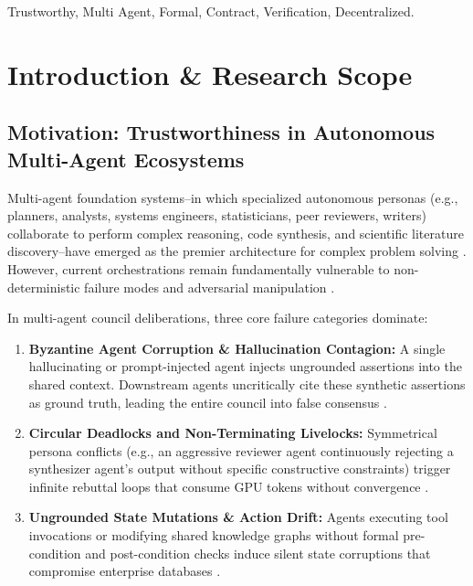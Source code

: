 \documentclass[10pt,journal,compsoc,twocolumn]{IEEEtran}
\begin{document}
\begin{IEEEkeywords}
Trustworthy, Multi Agent, Formal, Contract, Verification, Decentralized.
\end{IEEEkeywords}






\section{Introduction \& Research Scope}



\subsection{Motivation: Trustworthiness in Autonomous Multi-Agent Ecosystems}


Multi-agent foundation systems--in which specialized autonomous personas (e.g., planners, analysts, systems engineers, statisticians, peer reviewers, writers) collaborate to perform complex reasoning, code synthesis, and scientific literature discovery--have emerged as the premier architecture for complex problem solving \cite{arxiv_2005_14165,arxiv_2405_01543}. However, current orchestrations remain fundamentally vulnerable to non-deterministic failure modes and adversarial manipulation \cite{arxiv_2312_03893}.

In multi-agent council deliberations, three core failure categories dominate:
\begin{enumerate}
  \item \textbf{Byzantine Agent Corruption \& Hallucination Contagion:} A single hallucinating or prompt-injected agent injects ungrounded assertions into the shared context. Downstream agents uncritically cite these synthetic assertions as ground truth, leading the entire council into false consensus \cite{arxiv_2406_00584}.
  \item \textbf{Circular Deadlocks and Non-Terminating Livelocks:} Symmetrical persona conflicts (e.g., an aggressive reviewer agent continuously rejecting a synthesizer agent's output without specific constructive constraints) trigger infinite rebuttal loops that consume GPU tokens without convergence \cite{arxiv_2501_02497}.
  \item \textbf{Ungrounded State Mutations \& Action Drift:} Agents executing tool invocations or modifying shared knowledge graphs without formal pre-condition and post-condition checks induce silent state corruptions that compromise enterprise databases \cite{arxiv_2404_04289}.
\end{enumerate}
\end{document}
